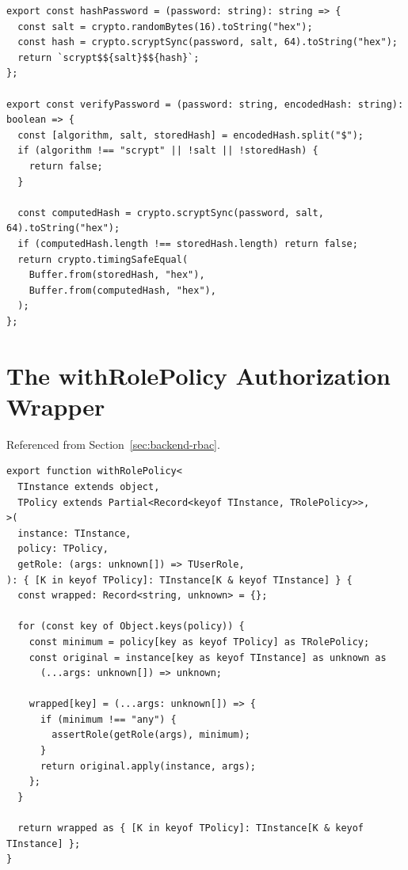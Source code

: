 \begin{lstlisting}[caption={[Password hashing and verification, in full.]{Password hashing and verification, in full (\texttt{server/auth/crypto.ts}).}}, label={lst:crypto-full}]
export const hashPassword = (password: string): string => {
  const salt = crypto.randomBytes(16).toString("hex");
  const hash = crypto.scryptSync(password, salt, 64).toString("hex");
  return `scrypt$${salt}$${hash}`;
};

export const verifyPassword = (password: string, encodedHash: string): boolean => {
  const [algorithm, salt, storedHash] = encodedHash.split("$");
  if (algorithm !== "scrypt" || !salt || !storedHash) {
    return false;
  }

  const computedHash = crypto.scryptSync(password, salt, 64).toString("hex");
  if (computedHash.length !== storedHash.length) return false;
  return crypto.timingSafeEqual(
    Buffer.from(storedHash, "hex"),
    Buffer.from(computedHash, "hex"),
  );
};
\end{lstlisting}

\clearpage
\section{The withRolePolicy Authorization Wrapper} \label{app:with-role-policy}

Referenced from Section~\ref{sec:backend-rbac}.

\begin{lstlisting}[caption={[The withRolePolicy authorization wrapper, in full.]{The \texttt{withRolePolicy} authorization wrapper, in full (\texttt{server/shared/authorize.ts}).}}, label={lst:with-role-policy-full}]
export function withRolePolicy<
  TInstance extends object,
  TPolicy extends Partial<Record<keyof TInstance, TRolePolicy>>,
>(
  instance: TInstance,
  policy: TPolicy,
  getRole: (args: unknown[]) => TUserRole,
): { [K in keyof TPolicy]: TInstance[K & keyof TInstance] } {
  const wrapped: Record<string, unknown> = {};

  for (const key of Object.keys(policy)) {
    const minimum = policy[key as keyof TPolicy] as TRolePolicy;
    const original = instance[key as keyof TInstance] as unknown as
      (...args: unknown[]) => unknown;

    wrapped[key] = (...args: unknown[]) => {
      if (minimum !== "any") {
        assertRole(getRole(args), minimum);
      }
      return original.apply(instance, args);
    };
  }

  return wrapped as { [K in keyof TPolicy]: TInstance[K & keyof TInstance] };
}
\end{lstlisting}

